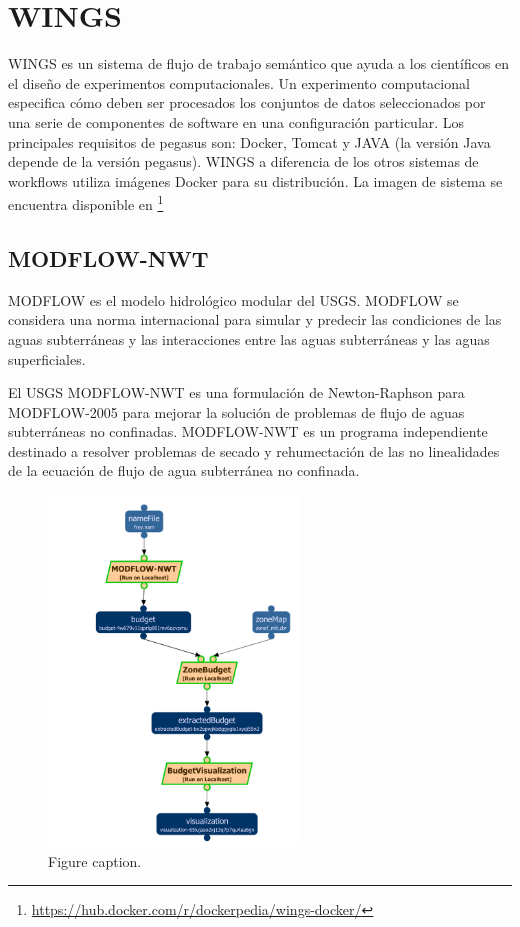\section{WINGS}

WINGS es un sistema de flujo de trabajo semántico que ayuda a los científicos en el diseño de experimentos computacionales. Un experimento computacional especifica cómo deben ser procesados los conjuntos de datos seleccionados por una serie de componentes de software en una configuración particular.
Los principales requisitos de pegasus son: Docker, Tomcat y JAVA (la versión Java depende de la versión pegasus).
WINGS a diferencia de los otros sistemas de workflows utiliza imágenes Docker para su distribución. La imagen de sistema se encuentra disponible en \footnote{\url{https://hub.docker.com/r/dockerpedia/wings-docker/}}



\subsection{MODFLOW-NWT}

MODFLOW es el modelo hidrológico modular del USGS. MODFLOW se considera una norma internacional para simular y predecir las condiciones de las aguas subterráneas y las interacciones entre las aguas subterráneas y las aguas superficiales.

El USGS MODFLOW-NWT es una formulación de Newton-Raphson para MODFLOW-2005 para mejorar la solución de problemas de flujo de aguas subterráneas no confinadas. MODFLOW-NWT es un programa independiente destinado a resolver problemas de secado y rehumectación de las no linealidades de la ecuación de flujo de agua subterránea no confinada.


\begin{figure}[t]
\centering
\includegraphics[width=0.6\textwidth]{Figures/usgs-modflow-nwt}
\caption{Figure caption.}\label{fig:modflow}
\end{figure}


